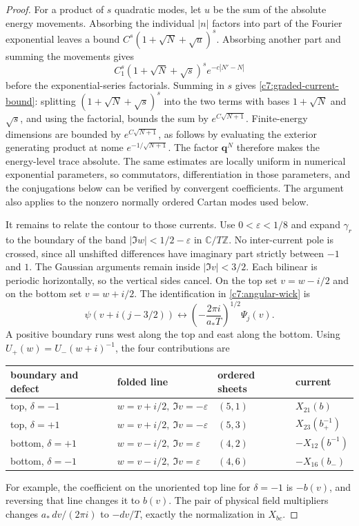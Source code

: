 \begin{proof}
For a product of $s$ quadratic modes, let $u$ be the sum of the absolute energy movements. Absorbing the individual $|n|$ factors into part of the Fourier exponential leaves a bound
$C^s(1+\sqrt N+\sqrt u)^s$. Absorbing another part and summing the movements gives
\[
C_1^s(1+\sqrt N+\sqrt s)^s e^{-c|N'-N|}
\]
before the exponential-series factorials. Summing in $s$ gives \eqref{c7:graded-current-bound}: splitting $(1+\sqrt N+\sqrt s)^s$ into the two terms with bases $1+\sqrt N$ and $\sqrt s$, and using the factorial, bounds the sum by $e^{C\sqrt{N+1}}$. Finite-energy dimensions are bounded by $e^{C\sqrt{N+1}}$, as follows by evaluating the exterior generating product at nome $e^{-1/\sqrt{N+1}}$. The factor $\mathbf q^N$ therefore makes the energy-level trace absolute. The same estimates are locally uniform in numerical exponential parameters, so commutators, differentiation in those parameters, and the conjugations below can be verified by convergent coefficients. The argument also applies to the nonzero normally ordered Cartan modes used below.

It remains to relate the contour to those currents. Use $0<\varepsilon<1/8$ and expand $\gamma_r$ to the boundary of the band $|\Im w|<1/2-\varepsilon$ in $\mathbb C/T\mathbb Z$. No inter-current pole is crossed, since all unshifted differences have imaginary part strictly between $-1$ and $1$. The Gaussian arguments remain inside $|\Im v|<3/2$. Each bilinear is periodic horizontally, so the vertical sides cancel. On the top set $v=w-i/2$ and on the bottom set $v=w+i/2$. The identification in \eqref{c7:angular-wick} is
\[
\psi(v+i(j-3/2))
\longleftrightarrow
\left(-\frac{2\pi i}{a_*T}\right)^{1/2}\Psi_j(v).
\]
A positive boundary runs west along the top and east along the bottom. Using $U_+(w)=U_-(w+i)^{-1}$, the four contributions are
\begin{center}
\small
\begin{tabular}{@{}llll@{}}
\toprule
boundary and defect&folded line&ordered sheets&current\\
\midrule
top, $\delta=-1$&$w=v+i/2,\ \Im v=-\varepsilon$&$(5,1)$&$X_{21}(b)$\\
top, $\delta=+1$&$w=v+i/2,\ \Im v=-\varepsilon$&$(5,3)$&$X_{23}(b_+^{-1})$\\
bottom, $\delta=+1$&$w=v-i/2,\ \Im v=\varepsilon$&$(4,2)$&$-X_{12}(b^{-1})$\\
bottom, $\delta=-1$&$w=v-i/2,\ \Im v=\varepsilon$&$(4,6)$&$-X_{16}(b_-)$\\
\bottomrule
\end{tabular}
\end{center}
For example, the coefficient on the unoriented top line for $\delta=-1$ is $-b(v)$, and reversing that line changes it to $b(v)$. The pair of physical field multipliers changes $a_*\,dv/(2\pi i)$ to $-dv/T$, exactly the normalization in $X_{bc}$.


\end{proof}
